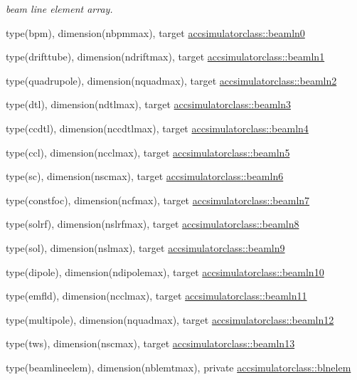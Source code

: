 \textbf{ }\par
{\em beam line element array. }\begin{DoxyCompactItemize}
\item 
type(bpm), dimension(nbpmmax), target \mbox{\hyperlink{namespaceaccsimulatorclass_a3c3a1b96070f5f9b755af7dc8502b457}{accsimulatorclass\+::beamln0}}
\item 
type(drifttube), dimension(ndriftmax), target \mbox{\hyperlink{namespaceaccsimulatorclass_a4afbfe5b21f1ef4f6ed80b26919a5b65}{accsimulatorclass\+::beamln1}}
\item 
type(quadrupole), dimension(nquadmax), target \mbox{\hyperlink{namespaceaccsimulatorclass_a84f0e00a948fce129634ef213a1e6146}{accsimulatorclass\+::beamln2}}
\item 
type(dtl), dimension(ndtlmax), target \mbox{\hyperlink{namespaceaccsimulatorclass_a676f0e0a8d52bb85779983a23300d307}{accsimulatorclass\+::beamln3}}
\item 
type(ccdtl), dimension(nccdtlmax), target \mbox{\hyperlink{namespaceaccsimulatorclass_aecdd8f634a42325f08705c6733739f5e}{accsimulatorclass\+::beamln4}}
\item 
type(ccl), dimension(ncclmax), target \mbox{\hyperlink{namespaceaccsimulatorclass_a1fe5a7819dc79e966a915ac7109a5921}{accsimulatorclass\+::beamln5}}
\item 
type(sc), dimension(nscmax), target \mbox{\hyperlink{namespaceaccsimulatorclass_aecb8568d8a048be9dd3f8ebf18c48e72}{accsimulatorclass\+::beamln6}}
\item 
type(constfoc), dimension(ncfmax), target \mbox{\hyperlink{namespaceaccsimulatorclass_aee9caad06453a0e66c229bf239519041}{accsimulatorclass\+::beamln7}}
\item 
type(solrf), dimension(nslrfmax), target \mbox{\hyperlink{namespaceaccsimulatorclass_a85003b545c7adc9e597e5fd6be9828c5}{accsimulatorclass\+::beamln8}}
\item 
type(sol), dimension(nslmax), target \mbox{\hyperlink{namespaceaccsimulatorclass_a7685c672080dfc1af30f91257a832844}{accsimulatorclass\+::beamln9}}
\item 
type(dipole), dimension(ndipolemax), target \mbox{\hyperlink{namespaceaccsimulatorclass_a62ff8549366c26dee5a585c8d900ebac}{accsimulatorclass\+::beamln10}}
\item 
type(emfld), dimension(ncclmax), target \mbox{\hyperlink{namespaceaccsimulatorclass_a016c645050aaca47150651536833a42d}{accsimulatorclass\+::beamln11}}
\item 
type(multipole), dimension(nquadmax), target \mbox{\hyperlink{namespaceaccsimulatorclass_a813aa983dff443b4b11bfcca3870d81a}{accsimulatorclass\+::beamln12}}
\item 
type(tws), dimension(nscmax), target \mbox{\hyperlink{namespaceaccsimulatorclass_aebf4a32dfb6382e980bd128f28575547}{accsimulatorclass\+::beamln13}}
\item 
type(beamlineelem), dimension(nblemtmax), private \mbox{\hyperlink{namespaceaccsimulatorclass_a2ca359e2c23c27bfccd5341fec0e7207}{accsimulatorclass\+::blnelem}}
\end{DoxyCompactItemize}

